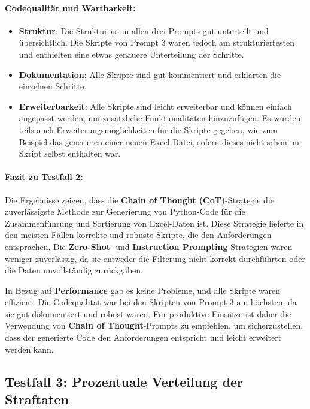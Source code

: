 \documentclass[11pt,a4paper]{article}
\begin{document}
\paragraph{Codequalität und Wartbarkeit:}
\begin{itemize}
    \item \textbf{Struktur}: Die Struktur ist in allen drei Prompts gut unterteilt und übersichtlich. Die Skripte von Prompt 3 waren jedoch am strukturiertesten und enthielten eine etwas genauere Unterteilung der Schritte.
    \item \textbf{Dokumentation}: Alle Skripte sind gut kommentiert und erklärten die einzelnen Schritte.
    \item \textbf{Erweiterbarkeit}: Alle Skripte sind leicht erweiterbar und können einfach angepasst werden, um zusätzliche Funktionalitäten hinzuzufügen. Es wurden teils auch Erweiterungsmöglichkeiten für die Skripte gegeben, wie zum Beispiel das generieren einer neuen Excel-Datei, sofern dieses nicht schon im Skript selbst enthalten war. 
\end{itemize}

\paragraph{Fazit zu Testfall 2:}
Die Ergebnisse zeigen, dass die \textbf{Chain of Thought (CoT)}-Strategie die zuverlässigste Methode zur Generierung von Python-Code für die Zusammenführung und Sortierung von Excel-Daten ist. Diese Strategie lieferte in den meisten Fällen korrekte und robuste Skripte, die den Anforderungen entsprachen. Die \textbf{Zero-Shot}- und \textbf{Instruction Prompting}-Strategien waren weniger zuverlässig, da sie entweder die Filterung nicht korrekt durchführten oder die Daten unvollständig zurückgaben. 

In Bezug auf \textbf{Performance} gab es keine Probleme, und alle Skripte waren effizient. Die Codequalität war bei den Skripten von Prompt 3 am höchsten, da sie gut dokumentiert und robust waren. Für produktive Einsätze ist daher die Verwendung von \textbf{Chain of Thought}-Prompts zu empfehlen, um sicherzustellen, dass der generierte Code den Anforderungen entspricht und leicht erweitert werden kann.

\subsection{Testfall 3: Prozentuale Verteilung der Straftaten}
\label{subsec:auswertung_testfall3}
\end{document}
